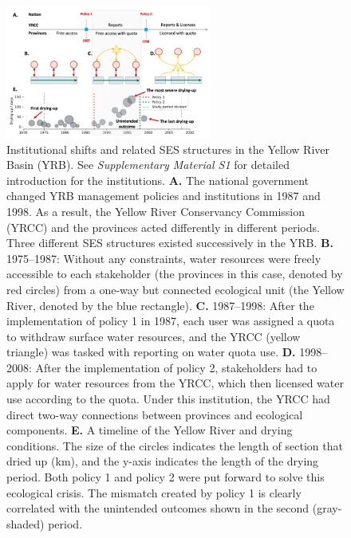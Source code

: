 \documentclass{../nsr}
\begin{document}
\begin{figure}[!ht]
    \centering
    \includegraphics[width=16pc]{diagrams/structure.jpg}
	\caption{
		Institutional shifts and related SES structures in the Yellow River Basin (YRB). See \textit{Supplementary Material S1} for detailed introduction for the institutions.
		\textbf{A.} The national government changed YRB management policies and institutions in 1987 and 1998. As a result, the Yellow River Conservancy Commission (YRCC) and the provinces acted differently in different periods. Three different SES structures existed successively in the YRB.
		\textbf{B.} 1975–1987: Without any constraints, water resources were freely accessible to each stakeholder (the provinces in this case, denoted by red circles) from a one-way but connected ecological unit (the Yellow River, denoted by the blue rectangle).
		\textbf{C.} 1987–1998: After the implementation of policy 1 in 1987, each user was assigned a quota to withdraw surface water resources, and the YRCC (yellow triangle) was tasked with reporting on water quota use.
		\textbf{D.} 1998–2008: After the implementation of policy 2, stakeholders had to apply for water resources from the YRCC, which then licensed water use according to the quota. Under this institution, the YRCC had direct two-way connections between provinces and ecological components.
		\textbf{E.} A timeline of the Yellow River and drying conditions. The size of the circles indicates the length of section that dried up (km), and the y-axis indicates the length of the drying period. Both policy 1 and policy 2 were put forward to solve this ecological crisis. The mismatch created by policy 1 is clearly correlated with the unintended outcomes shown in the second (gray-shaded) period.
	}
	\label{fig:structure}
\end{figure}
\end{document}
